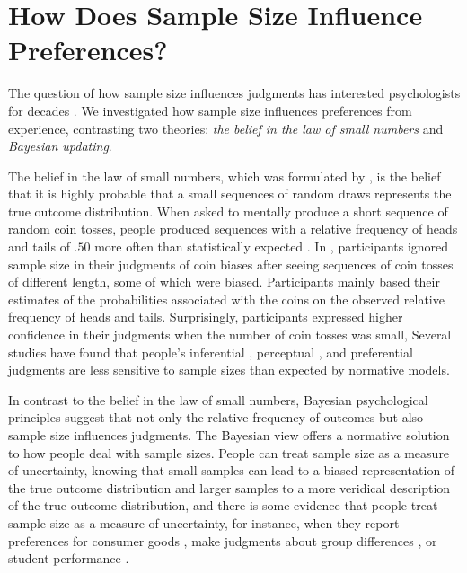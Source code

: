 \documentclass[a4paper, man, natbib, floatsintext]{apa6}
\begin{document}

\section{How Does Sample Size Influence Preferences?}
The question of how sample size influences judgments has interested psychologists for decades \citep[e.g.,][]{Tversky1971, Griffin1992}. We investigated how sample size influences preferences from experience, contrasting two theories: \textit{the belief in the law of small numbers} \citep{Tversky1971} and \textit{Bayesian updating}. 

The belief in the law of small numbers, which was formulated by \cite{Tversky1971}, is the belief that it is highly probable that a small sequences of random draws represents the true outcome distribution. When asked to mentally produce a short sequence of random coin tosses, people produced sequences with a relative frequency of heads and tails of $.50$ more often than statistically expected \citep{Tversky1971}. In \cite{Griffin1992}, participants ignored sample size in their judgments of coin biases after seeing sequences of coin tosses of different length, some of which were biased. Participants mainly based their estimates of the probabilities associated with the coins on the observed relative frequency of heads and tails. Surprisingly, participants expressed higher confidence in their judgments when the number of coin tosses was small,  Several studies have found that people's inferential \citep[e.g.,][]{Kutzner2016}, perceptual \citep[e.g.,][]{Kvam2016}, and preferential judgments \citep[e.g.,][]{Powell2017} are less sensitive to sample sizes than expected by normative models.

In contrast to the belief in the law of small numbers, Bayesian psychological principles suggest that not only the relative frequency of outcomes but also sample size influences judgments. The Bayesian view offers a normative solution to how people deal with sample sizes. People can treat sample size as a measure of uncertainty, knowing that small samples can lead to a biased representation of the true outcome distribution and larger samples to a more veridical description of the true outcome distribution, and there is some evidence that people treat sample size as a measure of uncertainty, for instance, when they report preferences for consumer goods \citep{DeMartino2017}, make judgments about group differences \citep{Obrecht2010}, or student performance \citep{Fiedler2002}.
\end{document}
